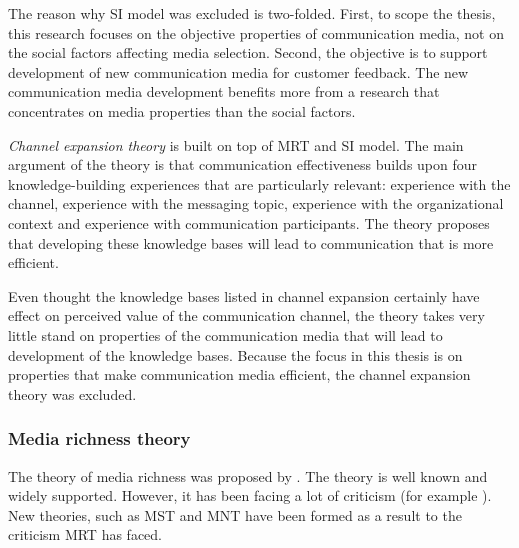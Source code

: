 \documentclass[english,12pt,a4paper,pdftex]{article}
\begin{document}
The reason why \ac{SI} model was excluded is two-folded. First, to scope the thesis, this research focuses on the objective properties of communication media, not on the social factors affecting media selection. Second, the objective is to support development of new communication media for customer feedback. The new communication media development benefits more from a research that concentrates on media properties than the social factors.

\emph{Channel expansion theory} is built on top of \ac{MRT} and \ac{SI} model. The main argument of the theory is that communication effectiveness builds upon four knowledge-building experiences that are particularly relevant: experience with the channel, experience with the messaging topic, experience with the organizational context and experience with communication participants. The theory proposes that developing these knowledge bases will lead to communication that is more efficient. \citep{carlson1994} \citep{carlson1999}

Even thought the knowledge bases listed in channel expansion certainly have effect on perceived value of the communication channel, the theory takes very little stand on properties of the communication media that will lead to development of the knowledge bases. Because the focus in this thesis is on properties that make communication media efficient, the channel expansion theory was excluded.

\subsubsection{Media richness theory}

The theory of media richness was proposed by \citet{daft1986}. The theory is well known and widely supported. However, it has been facing a lot of criticism (for example \citep{elshinnawy1997} \citep{dennis1999} \citep{korkala2006}). New theories, such as \ac{MST} and \ac{MNT} have been formed as a result to the criticism \ac{MRT} has faced.
\end{document}
